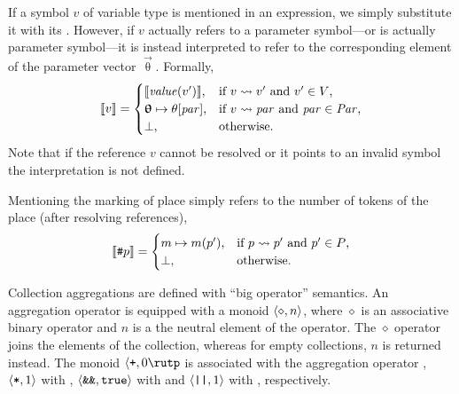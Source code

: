 If a symbol \(v\) of variable type is mentioned in an expression, we simply substitute it with its . However, if \(v\) actually refers to a parameter symbol---or is actually parameter symbol---it is instead interpreted to refer to the corresponding element of the parameter vector \(\vec{\uptheta}\). Formally,
\begin{equation}
  \llbracket v \rrbracket = \begin{cases}
    \llbracket \textrm{\itshape value\/}(v') \rrbracket \text, & \text{if \(v \leadsto v'\) and \(v' \in V\),} \\
    \bm{\mathrm{\uptheta}} \mapsto \theta[\textrm{\itshape par\/}] \text, & \text{if \(v \leadsto \textrm{\itshape par\/}\) and \(\textrm{\itshape par\/} \in \textrm{\itshape Par\/}\),} \\
    {\perp} \text, & \text{otherwise.}
  \end{cases}
\end{equation}
Note that if the reference \(v\) cannot be resolved or it points to an invalid symbol the interpretation is not defined.

Mentioning the marking of place simply refers to the number of tokens of the place (after resolving references),
\begin{equation}
  \llbracket \texttt{\upshape \#} p \rrbracket = \begin{cases}
    m \mapsto m(p')\text, & \text{if \(p \leadsto p'\) and \(p' \in P\),} \\
    {\perp} \text, & \text{otherwise.}
  \end{cases}
\end{equation}

Collection aggregations are defined with \enquote{big operator} semantics. An aggregation operator is equipped with a monoid \(\langle \diamond, n \rangle\), where \(\diamond\) is an associative binary operator and \(n\) is a the neutral element of the operator. The \(\diamond\) operator joins the elements of the collection, whereas for empty collections, \(n\) is returned instead. The monoid \(\ltup \lit+, 0\rutp\) is associated with the aggregation operator , \(\langle \texttt{\upshape *}, 1\rangle\) with , \(\langle \texttt{\upshape \&\&}, \texttt{\upshape true}\rangle\) with  and \(\langle \texttt{\upshape ||}, 1\rangle\) with , respectively.

